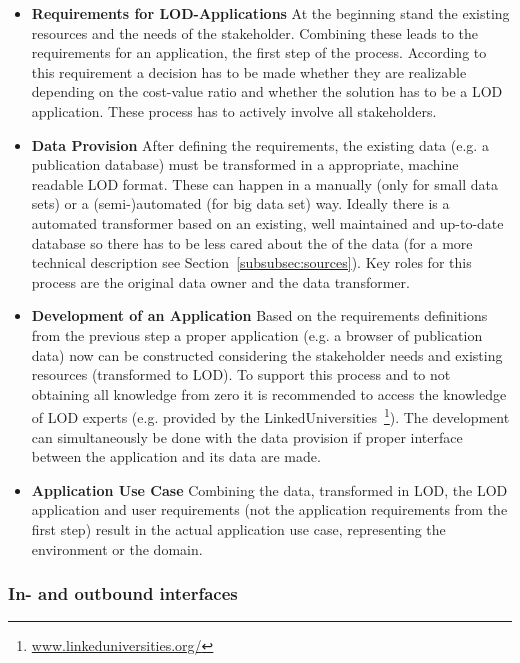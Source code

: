\begin{itemize}
	\item \textbf{Requirements for LOD-Applications}\newline
	At the beginning stand the existing resources and the needs of the stakeholder. Combining these leads to the requirements for an application, the first step of the process. According to this requirement a decision has to be made whether they are  realizable depending on the cost-value ratio and whether the solution has to be a LOD application. These process has to actively involve all stakeholders.
	\item \textbf{Data Provision}\newline
	After defining the requirements, the existing data (e.g. a publication database) must be transformed in a appropriate, machine readable LOD format. These can happen in a manually (only for small data sets) or a (semi-)automated (for big data set) way. Ideally there is a automated transformer based on an existing, well maintained and up-to-date database so there has to be less cared about the of the data (for a more technical description see Section~\ref{subsubsec:sources}). Key roles for this process are the original data owner and the data transformer.
	\item \textbf{Development of an Application}\newline
	Based on the requirements definitions from the previous step a proper application (e.g. a browser of publication data) now can be constructed considering the stakeholder needs and existing resources (transformed to LOD).  To support this process and to not obtaining all knowledge from zero it is recommended to access the knowledge of LOD experts (e.g. provided by the LinkedUniversities~\footnote{\url{www.linkeduniversities.org/}}). The development can simultaneously be done with the data provision if proper interface between the application and its data are made. 
	\item \textbf{Application Use Case}\newline
	Combining the data, transformed in LOD, the LOD application and user requirements (not the application requirements from the first step) result in the actual application use case, representing the environment or the domain.
\end{itemize}

\subsubsection{In- and outbound interfaces}

